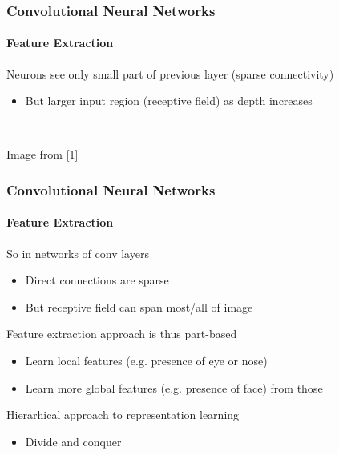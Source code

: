 \documentclass[xetex,professionalfont]{beamer}
\renewcommand\emph[1]{\textcolor{tuwcvl_cvl_blue}{#1}}
\begin{document}
\begin{frame}
\frametitle{Convolutional Neural Networks}
\framesubtitle{Feature Extraction}

Neurons see only small part of previous layer (sparse connectivity) %
\begin{itemize}
    \item But larger input region (\emph{receptive field}) as depth increases %
\end{itemize}

\

\begin{center}
    {\centering Image from [1]}
\end{center}

\end{frame}


\begin{frame}
\frametitle{Convolutional Neural Networks}
\framesubtitle{Feature Extraction}

So in networks of conv layers
\begin{itemize}
    \item Direct connections are sparse
    \item But receptive field can span most/all of image %
\end{itemize}

\bigskip

Feature extraction approach is thus part-based %
\begin{itemize}
    \item Learn local features (e.g. presence of eye or nose)
    \item Learn more global features (e.g. presence of face) from those
\end{itemize}

\bigskip

Hierarhical approach to representation learning
\begin{itemize}
    \item Divide and conquer
\end{itemize}

\end{frame}
\end{document}
